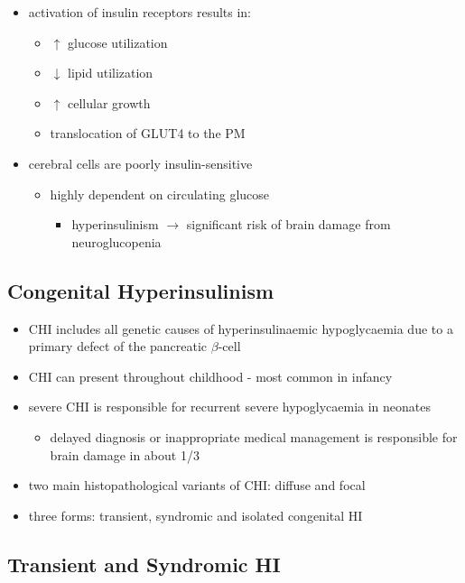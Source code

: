 \documentclass{scrartcl}
\begin{document}
\begin{itemize}
\item activation of insulin receptors results in:
\begin{itemize}
\item \(\uparrow\) glucose utilization
\item \(\downarrow\) lipid utilization
\item \(\uparrow\) cellular growth
\item translocation of GLUT4 to the PM
\end{itemize}
\item cerebral cells are poorly insulin-sensitive
\begin{itemize}
\item highly dependent on circulating glucose
\begin{itemize}
\item hyperinsulinism \(\to\) significant risk of brain damage from
neuroglucopenia
\end{itemize}
\end{itemize}
\end{itemize}

\subsection{Congenital Hyperinsulinism}
\label{sec:org186856a}
\begin{itemize}
\item CHI includes all genetic causes of hyperinsulinaemic
hypoglycaemia due to a primary defect of the pancreatic
\(\beta\)-cell
\item CHI can present throughout childhood - most common in infancy
\item severe CHI is responsible for recurrent severe hypoglycaemia in neonates
\begin{itemize}
\item delayed diagnosis or inappropriate medical management is responsible for brain damage in about 1/3
\end{itemize}
\item two main histopathological variants of CHI: diffuse and focal
\item three forms: transient, syndromic and isolated congenital HI
\end{itemize}

\subsection{Transient and Syndromic HI}
\label{sec:org5125bc2}
\end{document}

